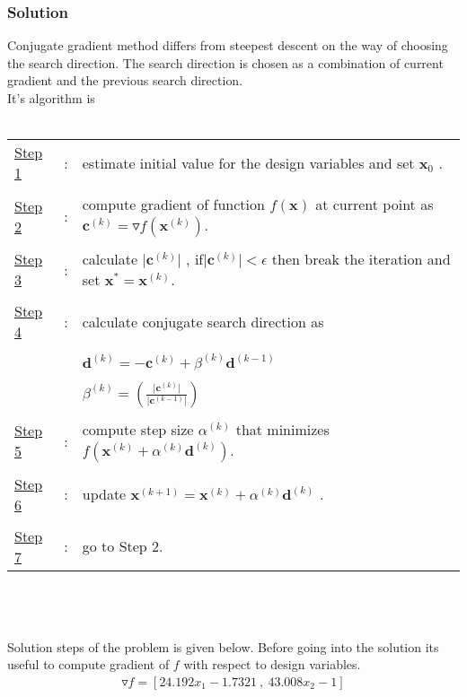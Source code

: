 \documentclass[]{report}
\begin{document}
\subsubsection*{Solution}
Conjugate gradient method differs from steepest descent on the way of choosing the search direction. The search direction is chosen as a combination of current gradient and the previous search direction.\newpage ~\\ It's algorithm is
\\
~\\
\begin{tabular}{lll}
\underline{Step 1} &:& estimate initial value for the design variables and set $\mathbf x_0$ .\\ 
&&\\
 \underline{Step 2} &:& compute gradient of function $f\left(\mathbf x\right)$ at current point as $\mathbf c^{(k)}=\triangledown f\left(\mathbf x^{(k)}\right)$.\\ 
 &&\\
 \underline{Step 3} &:& calculate $\lvert \mathbf c^{(k)}\rvert$ ,  if$\lvert \mathbf c^{(k)}\rvert<\epsilon$ then break the iteration and set $\mathbf x^*=\mathbf x^{(k)}$. \\ 
 &&\\
 \underline{Step 4} &:& calculate conjugate search direction as \\ 
  &&\\
  && $\mathbf d^{(k)}=-\mathbf c^{(k)}+\beta^{(k)}\mathbf{d}^{(k-1)}$   \\ 
  &&\\
   &&$\beta ^{(k)}=\left(\frac{\lvert \mathbf c^{(k)}\rvert}{\lvert \mathbf c^{(k-1)}\rvert}\right) $\\
 &&\\
 \underline{Step 5} &:& compute step size $\alpha^{(k)}$ that minimizes $f\left(\mathbf x^{(k)}+\alpha^{(k)}\mathbf d^{(k)}\right)$. \\ 
 &&\\
 \underline{Step 6} &:& update $\mathbf x^{(k+1)}=\mathbf x^{(k)}+\alpha^{(k)}\mathbf d^{(k)}$ .\\
  &&\\
\underline{Step 7} &:& go to Step 2.
\end{tabular} 
\\
~
\\
~
\\
Solution steps of the problem is given below. Before going into the solution its useful to compute gradient of $f$ with respect to design variables.
\begin{eqnarray*}
\mathbf \triangledown f=\left[24.192x_1-1.7321\ , \ 43.008x_2-1\right]
\end{eqnarray*}\\
\end{document}
